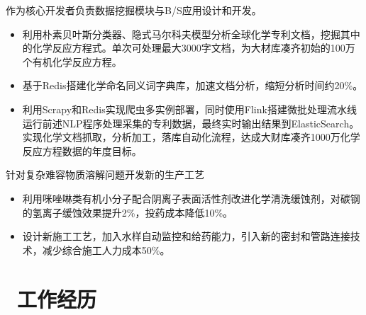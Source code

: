 \documentclass{resume}
\begin{document}
\begin{onehalfspacing}
作为核心开发者负责数据挖掘模块与B/S应用设计和开发。
\begin{itemize}
  \item 利用朴素贝叶斯分类器、隐式马尔科夫模型分析全球化学专利文档，挖掘其中的化学反应方程式。单次可处理最大3000字文档，为大材库凑齐初始的100万个有机化学反应方程。
  \item 基于Redis搭建化学命名同义词字典库，加速文档分析，缩短分析时间约20\%。
  \item 利用Scrapy和Redis实现爬虫多实例部署，同时使用Flink搭建微批处理流水线运行前述NLP程序处理采集的专利数据，最终实时输出结果到ElasticSearch。实现化学文档抓取，分析加工，落库自动化流程，达成大财库凑齐1000万化学反应方程数据的年度目标。
\end{itemize}
\end{onehalfspacing}

\begin{onehalfspacing}
针对复杂难容物质溶解问题开发新的生产工艺
\begin{itemize}
  \item 利用咪唑啉类有机小分子配合阴离子表面活性剂改进化学清洗缓蚀剂，对碳钢的氢离子缓蚀效果提升2\%，投药成本降低10\%。
  \item 设计新施工工艺，加入水样自动监控和给药能力，引入新的密封和管路连接技术，减少综合施工人力成本50\%。
\end{itemize}
\end{onehalfspacing}

\section{\faUsers\ 工作经历}



\end{document}
